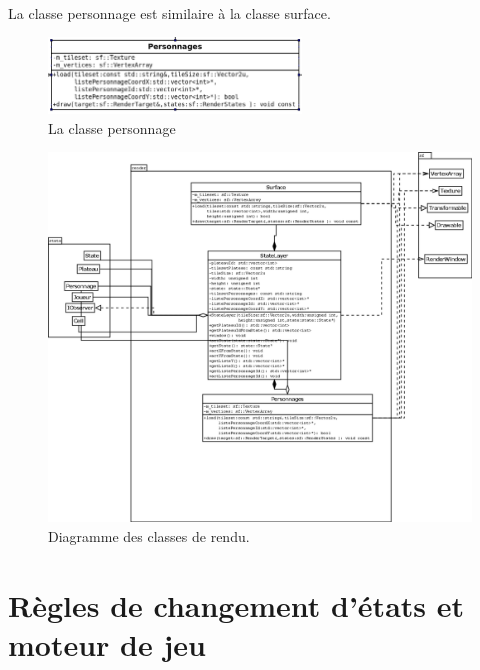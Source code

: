 \documentclass[a4paper,12pt]{article}
\begin{document}
\paragraph{} La classe personnage est similaire à la classe surface.

\begin{figure}[ht]
\begin{center}
\includegraphics[width=0.6\textwidth]{personnages.png}
\caption{\label{pacmangame}La classe personnage}
\end{center}
\end{figure}


\begin{landscape}
\begin{figure}[p]
\includegraphics[width=0.7\paperheight]{render.pdf}
\caption{\label{uml:render}Diagramme des classes de rendu.}
\end{figure}
\end{landscape}

\clearpage
\section{Règles de changement d'états et moteur de jeu}
\end{document}
